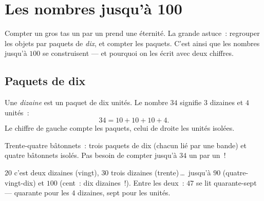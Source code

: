 \chapter{Les nombres jusqu'à 100}\label{ch:g1:tens}

Compter un gros tas un par un prend une éternité. La grande
astuce~: regrouper les objets par paquets de \emph{dix}, et compter
les paquets. C'est ainsi que les nombres jusqu'à $100$ se
construisent --- et pourquoi on les écrit avec deux chiffres.

\section{Paquets de dix}

\begin{definition}\label{def:g1:tens:def}
Une \emph{dizaine} est un paquet de dix unités. Le nombre $34$
signifie $3$ dizaines et $4$ unités~:
\[
34 = 10 + 10 + 10 + 4 .
\]
Le chiffre de gauche compte les paquets, celui de droite les unités
isolées.
\end{definition}

\begin{omfigure}

{\small Trente-quatre bâtonnets~: trois paquets de dix (chacun lié
par une bande) et quatre bâtonnets isolés. Pas besoin de compter
jusqu'à $34$ un par un~!}
\end{omfigure}

\begin{example}\label{ex:g1:tens:reading}
$20$ c'est deux dizaines (vingt), $30$ trois dizaines (trente)\,\dots\
jusqu'à $90$ (quatre-vingt-dix) et $100$ (cent~: dix dizaines~!).
Entre les deux~: $47$ se lit \guillemotleft{} quarante-sept
\guillemotright{} --- quarante pour les $4$ dizaines, sept pour les
unités.
\end{example}

